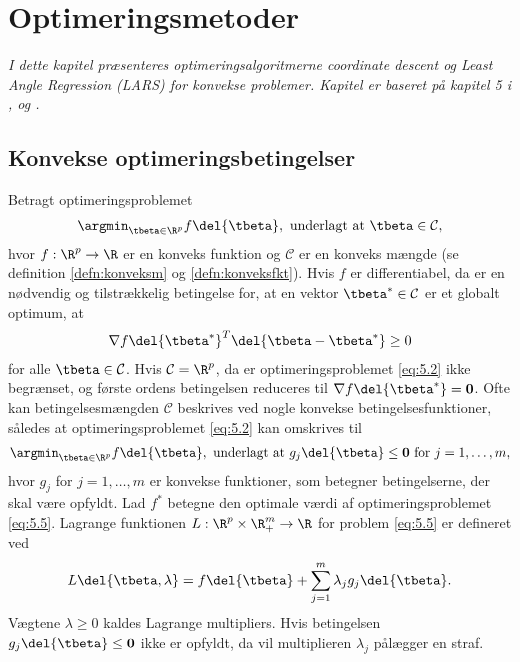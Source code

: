 \chapter{Optimeringsmetoder} \label{kap:optimeringsmetoder}
\textit{I dette kapitel præsenteres optimeringsalgoritmerne coordinate descent og Least Angle Regression (LARS) for konvekse problemer.
Kapitel er baseret på kapitel 5 i \citep{hastie}, \citep{glmnet1} og \citep{efron}.} 
%
\section{Konvekse optimeringsbetingelser}
Betragt optimeringsproblemet
\begin{align}
\argmin_{\tbeta \in \R^p} f \del{\tbeta}, \text{ underlagt at } \tbeta \in \mathcal{C}, \label{eq:5.2}
\end{align}
hvor \(f: \R^p \rightarrow \R\) er en konveks funktion og \(\mathcal{C}\) er en konveks mængde (se definition \ref{defn:konveksm} og \ref{defn:konveksfkt}).
Hvis \(f\) er differentiabel, da er en nødvendig og tilstrækkelig betingelse for, at en vektor \(\tbeta^* \in \mathcal{C}\) er et globalt optimum, at
\begin{align}
\nabla f \del{\tbeta^*}^T \del{ \tbeta - \tbeta^*} \geq 0 \label{eq:5.3}
\end{align}
for alle \(\tbeta \in \mathcal{C}\). 
Hvis \(\mathcal{C} = \R^p\), da er optimeringsproblemet \eqref{eq:5.2} ikke begrænset, og første ordens betingelsen reduceres til \(\nabla f \del{\tbeta^*} = \mathbf{0}\).
Ofte kan betingelsesmængden \(\mathcal{C}\) beskrives ved nogle konvekse betingelsesfunktioner, således at optimeringsproblemet \eqref{eq:5.2} kan omskrives til
\begin{align}
\argmin_{\tbeta \in \R^p} f \del{\tbeta}, \text{ underlagt at } g_j \del{\tbeta} \leq \mathbf{0} \text{ for } j = 1, \ldots, m, \label{eq:5.5}
\end{align}
hvor \(g_j\) for \(j=1, \ldots, m\) er konvekse funktioner, som betegner betingelserne, der skal være opfyldt.
Lad \(f^*\) betegne den optimale værdi af optimeringsproblemet \eqref{eq:5.5}.
Lagrange funktionen \(L: \R^p \times \R^m_+ \rightarrow \R\) for problem \eqref{eq:5.5} er defineret ved
\begin{align*}
L \del{\tbeta, \lambda} = f \del{\tbeta} + \sum_{j=1}^m \lambda_j g_j \del{\tbeta}.
\end{align*}
Vægtene \(\lambda \geq 0\) kaldes Lagrange multipliers.
Hvis betingelsen \(g_j \del{\tbeta} \leq \mathbf{0}\) ikke er opfyldt, da vil multiplieren \(\lambda_j\) pålægger en straf.
